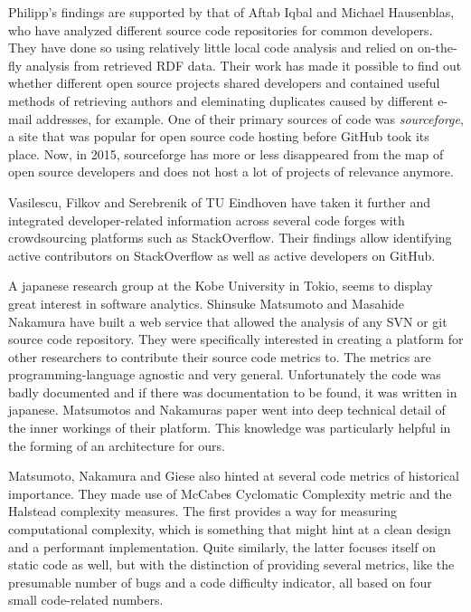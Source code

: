 Philipp's findings are supported by that of
Aftab Iqbal and Michael Hausenblas, who have analyzed different
source code repositories for common developers\cite{ih:2012}.
They have done so using relatively little local code analysis and relied
on on-the-fly analysis from retrieved RDF data. Their work
has made it possible to find out whether different open source projects shared developers
and contained useful methods of retrieving authors and eleminating duplicates
caused by different e-mail addresses, for example.
One of their primary sources of code was \textit{sourceforge}, a site that was
popular for open source code hosting before GitHub took its place.
Now, in 2015, sourceforge has more or less disappeared from the map of open
source developers and does not host a lot of projects of relevance anymore.

Vasilescu, Filkov and Serebrenik of TU Eindhoven have taken it further
and integrated developer-related information across several code forges
with crowdsourcing platforms such as StackOverflow\cite{vfs:2013}.
Their findings allow identifying active contributors on StackOverflow
as well as active developers on GitHub.
\newline

A japanese research group at the Kobe University in Tokio, seems
to display great interest in software analytics\cite{mn:2011}. Shinsuke Matsumoto and Masahide Nakamura
have built a web service that allowed the analysis of any SVN or git source code repository.
They were specifically interested in creating a platform for other researchers to
contribute their source code metrics to. The metrics are programming-language agnostic
and very general. Unfortunately the code was badly documented and if there was documentation
to be found, it was written in japanese. Matsumotos and Nakamuras paper
went into deep technical detail of the inner workings of their platform.
This knowledge was particularly helpful in the forming of an architecture for ours.

Matsumoto, Nakamura and Giese also hinted at several code metrics of historical
importance. They made use of McCabes Cyclomatic Complexity metric\cite{mc:1976}
and the Halstead complexity measures\cite{h:1977}.
The first provides a way for measuring computational complexity, which is
something that might hint at a clean design and a performant implementation.
Quite similarly, the latter focuses itself on static code as well, but with the
distinction of providing several metrics, like the presumable number of bugs and
a code difficulty indicator, all based on four small code-related numbers.
\newline

